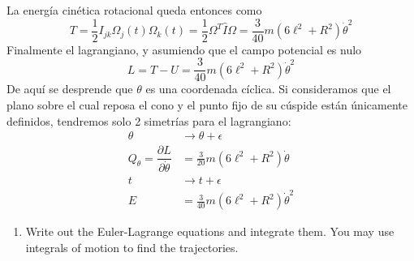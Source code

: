 \documentclass[]{article}
\numberwithin{equation}{section}
\newcommand{\0}{\textcolor{gray}{0}}
\newcommand{\pd}[2]{\dfrac{\partial #1}{\partial #2}}
\begin{document}
La energía cinética rotacional queda entonces como
\begin{equation}
	T = \frac{1}{2}I_{jk} \Omega_{j}(t) \Omega_{k}(t) = \frac{1}{2}\Omega^{T}\hat{I}\Omega = \frac{3}{40} m \left(6 \ell^2+R^2\right) \dot{\theta }^2
\end{equation}
Finalmente el lagrangiano, y asumiendo que el campo potencial es nulo
\begin{equation}
	L = T - U = \frac{3}{40} m \left(6 \ell^2+R^2\right) \dot{\theta }^2
\end{equation}
De aquí se desprende que \(\theta\) es una coordenada cíclica. Si consideramos que el plano sobre el cual reposa el cono y el punto fijo de su cúspide están únicamente definidos, tendremos solo 2 simetrías para el lagrangiano:
\begin{align}
	\theta &\rightarrow \theta + \epsilon \nonumber\\
	Q_\theta = \pd{L}{\dot{\theta}} &= \frac{3}{20} m \left(6 \ell^2+R^2\right) \dot{\theta }\\
	t &\rightarrow t + \epsilon \nonumber\\
	E &= \frac{3}{40} m \left(6 \ell^2+R^2\right) \dot{\theta }^2
\end{align}

\begin{enumerate}
	\item[\textbf{b.}] Write out the Euler-Lagrange equations and integrate	them. You may use integrals of motion to find the trajectories.
\end{enumerate}
\end{document}
